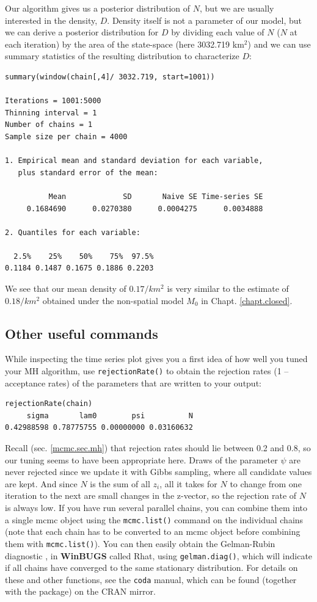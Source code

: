 Our algorithm gives us a posterior distribution of $N$, but we are usually
interested in the density, $D$. Density itself is not a parameter of our
model, but we can derive a posterior distribution for $D$ by dividing
each value of $N$ ($N$ at each iteration) by the area of the state-space
 (here 3032.719 km$^2$) and we can use summary statistics of the
 resulting distribution to characterize $D$:
\begin{verbatim}
summary(window(chain[,4]/ 3032.719, start=1001))

Iterations = 1001:5000
Thinning interval = 1
Number of chains = 1
Sample size per chain = 4000

1. Empirical mean and standard deviation for each variable,
   plus standard error of the mean:

          Mean             SD       Naive SE Time-series SE
     0.1684690      0.0270380      0.0004275      0.0034888

2. Quantiles for each variable:

  2.5%    25%    50%    75%  97.5%
0.1184 0.1487 0.1675 0.1886 0.2203
\end{verbatim}
We see that our mean density of $0.17/km^2$ is very similar to the estimate of $0.18/km^2$ obtained under the non-spatial model $M_0$ in Chapt. \ref{chapt.closed}.


\subsection{Other useful commands }
While inspecting the time series plot gives you a first idea of how well you tuned your MH algorithm, use \verb#rejectionRate()# to obtain the rejection rates (1 -- acceptance rates) of the parameters that are written to your output:
\begin{verbatim}
rejectionRate(chain)
     sigma       lam0        psi          N
0.42988598 0.78775755 0.00000000 0.03160632
\end{verbatim}
 Recall (sec. \ref{mcmc.sec.mh}) that rejection rates should lie between 0.2 and 0.8, so our tuning seems to have been appropriate here. Draws of the parameter $\psi$ are never rejected since we update it with Gibbs sampling, where all candidate values are kept. And since $N$ is the sum of all $z_i$, all it takes for $N$ to change from one iteration to the next are small changes in the z-vector, so the rejection rate of $N$ is always low.
If you have run several parallel chains, you can combine them into a single mcmc object using the \verb#mcmc.list()# command on the individual chains (note that each chain has to be converted to an mcmc object before combining them with \verb#mcmc.list()#). You can then easily obtain the Gelman-Rubin diagnostic \citep{gelman_etal:2004}, in {\bf WinBUGS} called Rhat, using \verb#gelman.diag()#, which
will indicate if all chains have converged to the same stationary distribution.
For details on these and other functions, see the \mbox{\tt coda} manual,
which can be found (together with the package) on the CRAN mirror.

